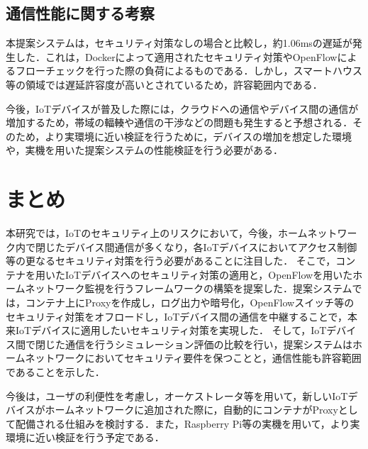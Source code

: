 \documentclass[Japanese]{dicomopapers}
\begin{document}
\subsection{通信性能に関する考察}
本提案システムは，セキュリティ対策なしの場合と比較し，約1.06msの遅延が発生した．これは，Dockerによって適用されたセキュリティ対策やOpenFlowによるフローチェックを行った際の負荷によるものである．しかし，スマートハウス等の領域では遅延許容度が高いとされている\cite{latency}ため，許容範囲内である．\par
今後，IoTデバイスが普及した際には，クラウドへの通信やデバイス間の通信が増加するため，帯域の輻輳や通信の干渉などの問題も発生すると予想される．そのため，より実環境に近い検証を行うために，デバイスの増加を想定した環境や，実機を用いた提案システムの性能検証を行う必要がある．

\section{まとめ}
本研究では，IoTのセキュリティ上のリスクにおいて，今後，ホームネットワーク内で閉じたデバイス間通信が多くなり，各IoTデバイスにおいてアクセス制御等の更なるセキュリティ対策を行う必要があることに注目した．
そこで，コンテナを用いたIoTデバイスへのセキュリティ対策の適用と，OpenFlowを用いたホームネットワーク監視を行うフレームワークの構築を提案した．提案システムでは，コンテナ上にProxyを作成し，ログ出力や暗号化，OpenFlowスイッチ等のセキュリティ対策をオフロードし，IoTデバイス間の通信を中継することで，本来IoTデバイスに適用したいセキュリティ対策を実現した．
そして，IoTデバイス間で閉じた通信を行うシミュレーション評価の比較を行い，提案システムはホームネットワークにおいてセキュリティ要件を保つことと，通信性能も許容範囲であることを示した．\par
今後は，ユーザの利便性を考慮し，オーケストレータ等を用いて，新しいIoTデバイスがホームネットワークに追加された際に，自動的にコンテナがProxyとして配備される仕組みを検討する．また，Raspberry Pi等の実機を用いて，より実環境に近い検証を行う予定である．
\end{document}
